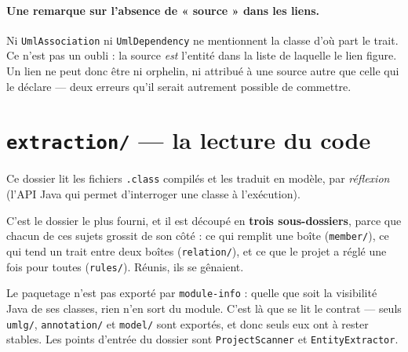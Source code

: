\documentclass[12pt, a4paper]{article}
\begin{document}
\paragraph{Une remarque sur l'absence de « source » dans les liens.}
Ni \texttt{UmlAssociation} ni \texttt{UmlDependency} ne mentionnent la classe d'où part le
trait. Ce n'est pas un oubli : la source \emph{est} l'entité dans la liste de laquelle le lien
figure. Un lien ne peut donc être ni orphelin, ni attribué à une source autre que celle qui le
déclare — deux erreurs qu'il serait autrement possible de commettre.

\section{\texttt{extraction/} — la lecture du code}

Ce dossier lit les fichiers \texttt{.class} compilés et les traduit en modèle, par
\emph{réflexion} (l'API Java qui permet d'interroger une classe à l'exécution).

C'est le dossier le plus fourni, et il est découpé en \textbf{trois sous-dossiers}, parce que
chacun de ces sujets grossit de son côté : ce qui remplit une boîte (\texttt{member/}), ce qui
tend un trait entre deux boîtes (\texttt{relation/}), et ce que le projet a réglé une fois pour
toutes (\texttt{rules/}). Réunis, ils se gênaient.

Le paquetage n'est pas exporté par \texttt{module-info} : quelle que soit la visibilité Java
de ses classes, rien n'en sort du module. C'est là que se lit le contrat — seuls
\texttt{umlg/}, \texttt{annotation/} et \texttt{model/} sont exportés, et donc seuls eux ont
à rester stables. Les points d'entrée du dossier sont \texttt{ProjectScanner} et
\texttt{EntityExtractor}.
\end{document}
